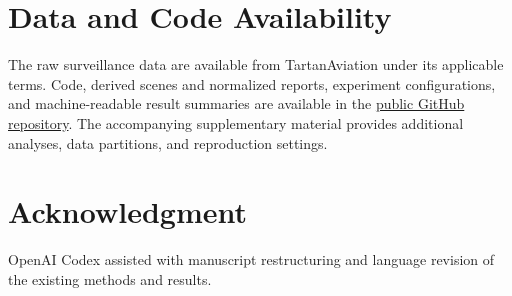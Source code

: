 \documentclass[10pt,journal,letterpaper]{IEEEtran}
\begin{document}
\section*{Data and Code Availability}
The raw surveillance data are available from TartanAviation \cite{patrikar2025tartanaviation} under its applicable terms. Code, derived scenes and normalized reports, experiment configurations, and machine-readable result summaries are available in the \href{https://github.com/wenmu663559/adsb-future-onset-interaction-forecasting}{public GitHub repository}. The accompanying supplementary material provides additional analyses, data partitions, and reproduction settings.

\section*{Acknowledgment}
OpenAI Codex assisted with manuscript restructuring and language revision of the existing methods and results.

\clearpage


\end{document}
